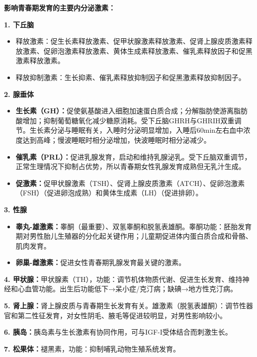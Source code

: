 \begin{keybox}
\textbf{影响青春期发育的主要内分泌激素：}

\textbf{1. 下丘脑}
\begin{itemize}
    \item 释放激素：促生长素释放激素、促甲状腺激素释放激素、促肾上腺皮质激素释放激素、促卵泡激素释放激素、黄体生成素释放激素、催乳素释放因子和促黑激素释放激素。
    \item 释放抑制激素：生长抑素、催乳素释放抑制因子和促黑激素释放抑制因子。
\end{itemize}

\textbf{2. 腺垂体}
\begin{itemize}
    \item \textbf{生长素（GH）：}促使氨基酸进入细胞加速蛋白质合成；分解脂肪使游离脂肪酸增加；抑制葡萄糖氧化减少糖原消耗。受下丘脑GHRH与GHRIH双重调节。生长素分泌与睡眠有关，入睡时分泌明显增加，入睡后60min左右血中浓度达到高峰；慢波睡眠时相分泌增加，快波睡眠时相分泌减少。
    \item \textbf{催乳素（PRL）：}促进乳腺发育，启动和维持乳腺泌乳。受下丘脑双重调节，正常生理情况下抑制占优势，所以青春期女性乳腺发育成熟但无乳汁生成。
    \item \textbf{促激素：}促甲状腺激素（TSH）、促肾上腺皮质激素（ATCH）、促卵泡激素（FSH）（促进卵泡成熟）和黄体生成素（LH）（促进排卵）。
\end{itemize}

\textbf{3. 性腺}
\begin{itemize}
    \item \textbf{睾丸-雄激素：}睾酮（最重要）、双氢睾酮和脱氢表雄酮。睾酮功能：胚胎发育期对男性胎儿生殖器的分化起关键作用；儿童期促进体内蛋白质合成和骨骼、肌肉发育。
    \item \textbf{卵巢-雌激素：}促进女性青春期乳腺发育最关键的激素。
\end{itemize}

\textbf{4. 甲状腺：}甲状腺素（TH），功能：调节机体物质代谢、促进生长发育、维持神经和心血管功能。出生后功能低下→呆小症/克汀病；缺碘→地方性克汀病。

\textbf{5. 肾上腺：}肾上腺皮质与青春期生长发育有关。雄激素（脱氢表雄酮）：调节性器官和第二性征发育，对女性阴毛、腋毛等促进较明显，对男性影响较小。

\textbf{6. 胰岛：}胰岛素与生长激素有协同作用，可与IGF-I受体结合而刺激生长。

\textbf{7. 松果体：}褪黑素，功能：抑制哺乳动物生殖系统发育。
\end{keybox}

